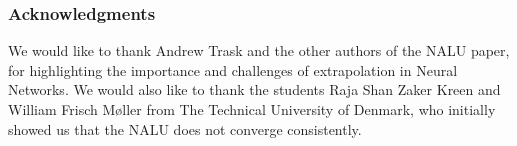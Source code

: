 \documentclass{article}
\begin{document}






\clearpage
\ifdefined\nonanonymous
\subsubsection*{Acknowledgments}
We would like to thank Andrew Trask and the other authors of the NALU paper, for highlighting the importance and challenges of extrapolation in Neural Networks. We would also like to thank the students Raja Shan Zaker Kreen and William Frisch Møller from The Technical University of Denmark, who initially showed us that the NALU does not converge consistently.
\fi




\newpage
\appendix

\clearpage

\clearpage

\clearpage
\end{document}
